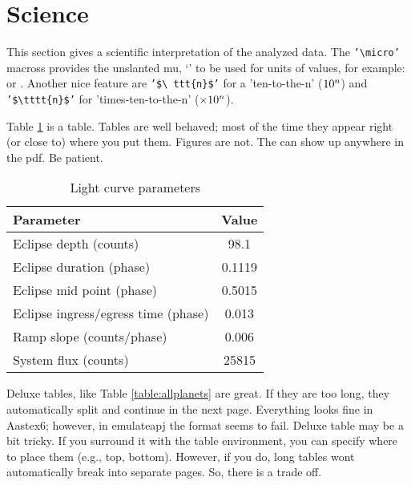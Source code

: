 \section{Science}
\label{sec:science}

This section gives a scientific interpretation of the analyzed data.
The \texttt{'\textbackslash micro'} macross provides the unslanted mu,
`{\micro}' to be used for units of values, for example: {\micron} or
{\microbar}.  Another nice feature are \texttt{'\$\textbackslash
  ttt\{n\}\$'} for a 'ten-to-the-n' ($\ttt{n}$) and
\texttt{'\$\textbackslash tttt\{n\}\$'} for 'times-ten-to-the-n'
($\tttt{n}$).

Table \ref{table:parameters} is a table.  Tables are well behaved;
most of the time they appear right (or close to) where you put them.
Figures are not.  The can show up anywhere in the pdf.   Be patient.

\begin{table}[ht]
\centering
\caption{\label{table:parameters} Light curve parameters}
\begin{tabular}{lc}
\hline
\hline
Parameter                           & Value           \\
\hline
Eclipse depth (counts)              & 98.1            \\
Eclipse duration (phase)            & 0.1119          \\
Eclipse mid point (phase)           & 0.5015          \\
Eclipse ingress/egress time (phase) & 0.013           \\
Ramp slope (counts/phase)           & 0.006           \\
System flux (counts)                & 25815           \\
\hline
\end{tabular}
\end{table}


Deluxe tables, like Table \ref{table:allplanets} are great. If they
are too long, they automatically split and continue in the next
page. Everything looks fine in Aastex6; however, in emulateapj the
format seems to fail.
Deluxe table may be a bit tricky. If you surround it with the table
environment, you can specify where to place them (e.g., top, bottom).
However, if you do, long tables wont automatically break into separate
pages.  So, there is a trade off.

